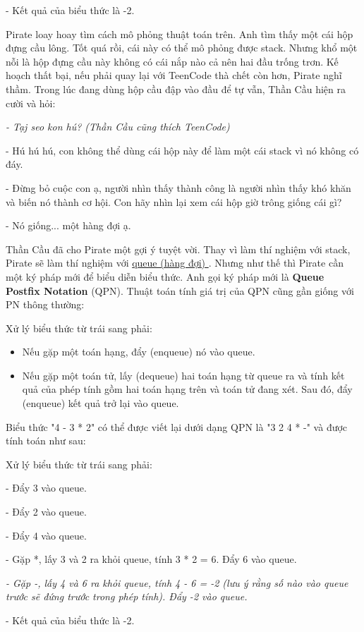 - Kết quả của biểu thức là -2.

   Pirate loay hoay tìm cách mô phỏng thuật toán trên. Anh tìm thấy một cái hộp đựng cầu lông. Tốt quá rồi, cái này có thể mô phỏng được stack. Nhưng khổ một nỗi là hộp đựng cầu này không có cái nắp nào cả nên hai đầu trống trơn. Kế hoạch thất bại, nếu phải quay lại với TeenCode thà chết còn hơn, Pirate nghĩ thầm. Trong lúc đang dùng hộp cầu đập vào đầu để tự vẫn, Thần Cầu hiện ra cười và hỏi:  

\emph{    - Tạj seo kon hú? (Thần Cầu cũng thích TeenCode)    
\\}

- Hú hú hú, con không thể dùng cái hộp này để làm một cái stack vì nó không có đáy.

- Đừng bỏ cuộc con ạ, người nhìn thấy thành công là người nhìn thấy khó khăn và biến nó thành cơ hội. Con hãy nhìn lại xem cái hộp giờ trông giống cái gì?

- Nó giống... một hàng đợi ạ.

   Thần Cầu đã cho Pirate một gợi ý tuyệt vời. Thay vì làm thí nghiệm với stack, Pirate sẽ làm thí nghiệm với   \href{http://www.cosc.canterbury.ac.nz/mukundan/dsal/QueueAppl.html}{    queue (hàng đợi)   }   . Nhưng như thế thì Pirate cần một ký pháp mới để biểu diễn biểu thức. Anh gọi ký pháp mới là   \textbf{    Queue Postfix Notation   }   (QPN). Thuật toán tính giá trị của QPN cũng gần giống với PN thông thường:  

Xử lý biểu thức từ trái sang phải:
\begin{itemize}
	\item Nếu gặp một toán hạng, đẩy (enqueue) nó vào queue.
	\item Nếu gặp một toán tử, lấy (dequeue) hai toán hạng từ queue ra và tính kết  quả của phép tính gồm hai toán hạng trên và toán tử đang xét. Sau đó,  đẩy (enqueue) kết quả trở lại vào queue.
\end{itemize}

   Biểu thức "4 - 3 * 2" có thể được viết lại dưới dạng QPN là "3 2 4 * -" và được tính toán như sau:  

    Xử lý biểu thức từ trái sang phải:   

- Đẩy 3 vào queue.

- Đẩy 2 vào queue.

- Đẩy 4 vào queue.

- Gặp *, lấy 3 và 2 ra khỏi queue, tính 3 * 2 = 6. Đẩy 6 vào queue.

\emph{    - Gặp -, lấy 4 và 6 ra khỏi queue, tính 4 - 6 = -2 (lưu ý rằng số nào vào queue trước sẽ đứng trước trong phép tính). Đẩy -2 vào queue.    
\\}

- Kết quả của biểu thức là -2.